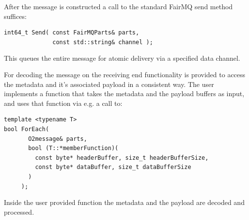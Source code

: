 \documentclass[a4paper,twoside]{article}
\begin{document}
After the message is constructed a call to the standard FairMQ send method suffices:
\begin{lstlisting}
int64_t Send( const FairMQParts& parts,
              const std::string& channel );
\end{lstlisting}
This queues the entire message for atomic delivery via a specified data channel.

For decoding the message on the receiving end functionality is provided to access the metadata and it's associated payload in a consistent way. The user implements a function that takes the metadata and the payload buffers as input, and uses that function via e.g. a call to:
\begin{lstlisting}
template <typename T>
bool ForEach(
       O2message& parts,
       bool (T::*memberFunction)(
         const byte* headerBuffer, size_t headerBufferSize,
         const byte* dataBuffer, size_t dataBufferSize
       )
     );
\end{lstlisting}
Inside the user provided function the metadata and the payload are decoded and processed.

\printbibliography
\end{document}
